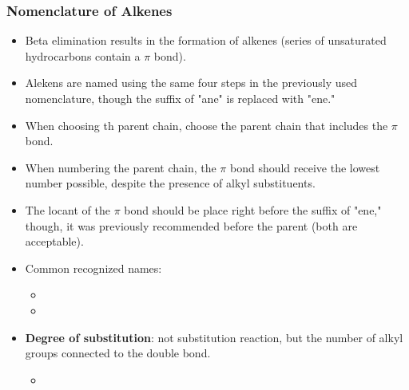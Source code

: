 \documentclass[12pt,a4paper]{article}
\begin{document}
\begin{itemize}
    \subsubsection{Nomenclature of Alkenes}
    \begin{itemize}
        \item Beta elimination results in the formation of alkenes (series of unsaturated hydrocarbons contain a $\pi$ bond).
        \item Alekens are named using the same four steps in the previously used nomenclature, though the suffix of {\color{G-Moon}"ane"} is replaced with {\color{o-Sun}"ene."}
        \item When choosing th parent chain, choose the parent chain that {\color{o-Sun}includes} the $\pi$ bond.
        \item When numbering the parent chain, the $\pi$ bond should receive the {\color{o-Sun}lowest} number possible, {\color{o-Sun}despite the presence of alkyl substituents}.
        \item The locant of the $\pi$ bond should be place right before the suffix of "ene," though, it was previously recommended before the parent (both are acceptable).
        \item Common recognized names:
            \begin{itemize}
                \item {}
                \hspace*{12pt}
                \hspace*{12pt}
                \item  {}
                \hspace*{12pt}
                \hspace*{12pt}
            \end{itemize}
        \item \textbf{Degree of substitution}: not substitution reaction, but the {\color{o-Sun}number of alkyl groups} connected to the double bond.
            \begin{itemize}
                \item {}
                \hspace*{12pt}
                \hspace*{12pt}
                \hspace*{12pt}
            \end{itemize}
    \end{itemize}

\end{itemize}
\end{document}
